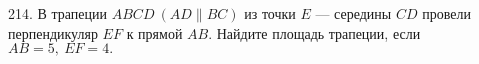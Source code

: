 214. В трапеции  $ABCD\  (AD\parallel BC)$ из точки  $E$ --- середины  $CD$ провели перпендикуляр  $EF$ к прямой  $AB.$
Найдите площадь трапеции, если  $AB=5,\ EF=4.$\\
